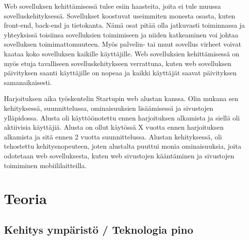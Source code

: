 \documentclass[11pt,a4paper,titlepage,oneside]{article}
\begin{document}

Web sovelluksen kehittämisessä tulee esiin haasteita, joita ei tule muussa sovelluskehityksessä.
Sovellukset koostuvat useimmiten monesta osasta, kuten front-end, back-end ja tietokanta.
Nämä osat pitää olla jatkuvasti toiminnassa ja yhteyksissä toisiinsa sovelluksien toimimiseen ja niiden katkeaminen voi
johtaa sovelluksen toimimattomuuteen.
Myös palvelin- tai muut sovellus virheet voivat kaataa koko sovelluksen kaikille käyttäjille. 
Web sovelluksien kehittämisessä on myös etuja tavalliseen sovelluskehitykseen verrattuna, kuten 
web sovelluksen päivityksen saanti käyttäjille on nopeaa ja kaikki käyttäjät saavat päivityksen samanaikaisesti.
\medskip

Harjoituksen aika työskentelin Startupin web alustan kanssa. 
Olin mukana sen kehityksessä, suunnittelussa, ominaisuuksien lisäämisessä ja sivustojen ylläpidossa.
Alusta oli käyttöönotettu ennen harjoituksen alkamista ja siellä oli aktiivisia käyttäjiä.
Alusta on ollut käytössä X vuotta ennen harjoituksen alkamista ja sitä ennen 2 vuotta suunnittelussa.
Alustan kehityksessä, oli tehostettu kehitysnopeuteen,
joten alustalta puuttui monia ominaisuuksia, joita odotetaan web sovelluksesta, 
kuten web sivustojen kääntäminen ja sivustojen toimiminen mobiililaitteilla.
\medskip

























\newpage
\section{Teoria}                %



\subsection{Kehitys ympäristö / Teknologia pino}
\end{document}
